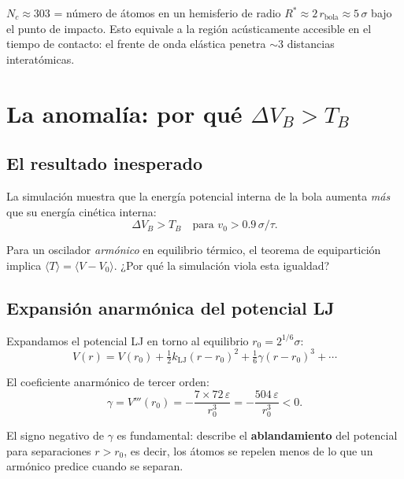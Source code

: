 \documentclass[11pt, a4paper]{article}
\begin{document}
\begin{mdframed}[style=resultado]
$N_c \approx 303$ = número de átomos en un hemisferio de radio
$R^* \approx 2\,r_\text{bola} \approx 5\,\sigma$ bajo el punto de impacto.
Esto equivale a la región acústicamente accesible en el tiempo de contacto:
el frente de onda elástica penetra $\sim 3$ distancias interatómicas.
\end{mdframed}

\section{La anomalía: por qué \texorpdfstring{$\Delta V_B > T_B$}{ΔVB > TB}}

\subsection{El resultado inesperado}

La simulación muestra que la energía potencial interna de la bola aumenta
\emph{más} que su energía cinética interna:
\begin{equation}
  \Delta V_B > T_B \quad \text{para } v_0 > 0.9\,\sigma/\tau.
\end{equation}

Para un oscilador \emph{armónico} en equilibrio térmico, el teorema de
equipartición implica $\langle T \rangle = \langle V - V_0 \rangle$. ¿Por qué
la simulación viola esta igualdad?

\subsection{Expansión anarmónica del potencial LJ}

Expandamos el potencial LJ en torno al equilibrio $r_0 = 2^{1/6}\sigma$:
\begin{equation}
  V(r) = V(r_0) + \tfrac{1}{2}k_\text{LJ}(r-r_0)^2
         + \tfrac{1}{6}\gamma(r-r_0)^3 + \cdots
  \label{eq:lj_expansion}
\end{equation}

El coeficiente anarmónico de tercer orden:
\begin{equation}
  \gamma = V'''(r_0) = -\frac{7 \times 72\,\varepsilon}{r_0^3}
         = -\frac{504\,\varepsilon}{r_0^3} < 0.
\end{equation}

El signo negativo de $\gamma$ es fundamental: describe el \textbf{ablandamiento}
del potencial para separaciones $r > r_0$, es decir, los átomos se repelen
menos de lo que un armónico predice cuando se separan.
\end{document}
